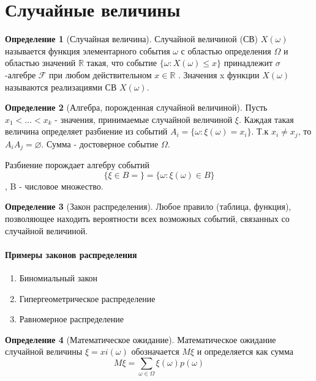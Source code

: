 \documentclass[a4paper]{article}
\theoremstyle{definition}
\newtheorem*{definition}{Определение}
\theoremstyle{remark}
\begin{document}
\section{Случайные величины}
\begin{definition}[Случайная величина]
    Случайной величиной (СВ) $X(\omega)$ называется функция элементарного события $\omega$ с областью определения $\Omega$
и областью значений $\mathbb{R}$ такая, что событие $\{\omega : X(\omega) \leq x\}$ принадлежит $\sigma$ -алгебре $\mathcal{F}$ при любом действительном $x \in \mathbb{R}$ . Значения x функции $X(\omega)$ называются реализациями СВ $X(\omega)$.    
\end{definition}
\begin{definition}[Алгебра, порожденная случайной величиной]
    Пусть $x_1< \dots< x_k$ - значения, принимаемые случайной величиной $\xi$. Каждая такая
    величина определяет разбиение из событий $A_i = \{\omega : \xi(\omega) = x_i\}$.
    Т.к $x_i\neq x_j$, то $A_i A_j = \varnothing$. Сумма - достоверное событие $\Omega$.

    Разбиение порождает алгебру событий \[\{\xi \in B =\} = \{\omega: \xi (\omega) \in B\} \],
    B - числовое множество. 
\end{definition}
\begin{definition}[Закон распределения]
    Любое правило (таблица, функция), позволяющее находить вероятности всех возможных событий, связанных со случайной величиной.
\end{definition}

\paragraph*{Примеры законов распределения}
\begin{enumerate}
    \item Биномиальный закон
    \item Гипергеометрическое распределение
    \item Равномерное распределение
\end{enumerate}

\begin{definition}[Математическое ожидание]
    Математическое ожидание случайной величины $\xi = xi(\omega)$ обозначается $M\xi$ и определяется как сумма
    \[M\xi = \sum_{\omega \in \Omega} \xi(\omega) p(\omega)\]
\end{definition}
\end{document}
